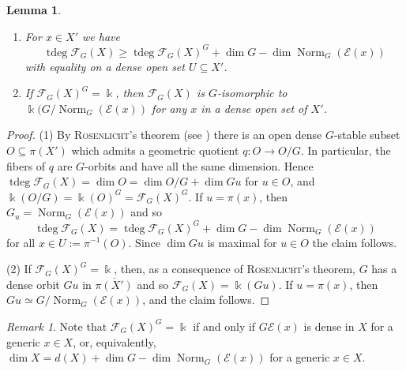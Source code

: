 \documentclass{amsart}
\newtheorem{lem}[thm]{Lemma}
\theoremstyle{definition}
\theoremstyle{remark}
\newtheorem{rem}[thm]{Remark}
\begin{document}
\begin{lem}\label{first-integrals.lem}
\begin{enumerate}
\item
For $x \in X'$ we have
$$
\operatorname{tdeg}{\mathcal F}_{G}(X) \geq \operatorname{tdeg}{\mathcal F}_{G}(X)^{G} + \dim G - \dim \operatorname{Norm}_{G}({\mathcal E}(x))
$$
with equality on a dense open set  $U {\subseteq} X'$.
\item
If ${\mathcal F}_{G}(X)^{G}={\Bbbk}$, then ${\mathcal F}_{G}(X)$ is $G$-isomorphic to ${\Bbbk}(G/\operatorname{Norm}_{G}({\mathcal E}(x))$ for any $x$ in a dense open set of $X'$.
\end{enumerate}
\end{lem}
\begin{proof}
(1) By {\textsc{{Rosenlicht}\/}}'s theorem (see \cite[Satz~2.2]{Sp1989Aktionen-reduktive}) there is an open dense $G$-stable subset $O {\subseteq} \pi(X')$ which admits a geometric quotient $q \colon O \to O/G$. In particular, the fibers of $q$  are $G$-orbits and have all the same dimension. Hence $\operatorname{tdeg}{\mathcal F}_{G}(X) = \dim O = \dim O/G + \dim Gu$ for $u \in O$, and ${\Bbbk}(O/G) = {\Bbbk}(O)^{G}={\mathcal F}_{G}(X)^{G}$. If $u = \pi(x)$, then $G_{u}= \operatorname{Norm}_{G}({\mathcal E}(x))$ and so
$$
\operatorname{tdeg}{\mathcal F}_{G}(X) = \operatorname{tdeg}{\mathcal F}_{G}(X)^{G} + \dim G - \dim \operatorname{Norm}_{G}({\mathcal E}(x))
$$
for all $x \in U:=\pi^{-1}(O)$. Since $\dim Gu$ is maximal for $u \in O$ the claim follows.
\par\smallskip
(2) If ${\mathcal F}_{G}(X)^{G}={\Bbbk}$, then, as a consequence of {\textsc{{Rosenlicht}\/}}'s theorem, $G$ has a dense orbit $Gu$ in $\overline{\pi(X')}$ and so ${\mathcal F}_{G}(X) = {\Bbbk}(Gu)$. If $u = \pi(x)$, then $Gu \simeq G/\operatorname{Norm}_{G}({\mathcal E}(x))$, and the claim follows.
\end{proof}

\begin{rem}
Note that ${\mathcal F}_{G}(X)^{G}={\Bbbk}$ if and only if $G {\mathcal E}(x)$ is dense in $X$ for a generic $x \in X$, or, equivalently, $\dim X =  d(X) + \dim G - \dim \operatorname{Norm}_{G}({\mathcal E}(x))$ for a generic $x \in X$.
\end{rem}
\end{document}
